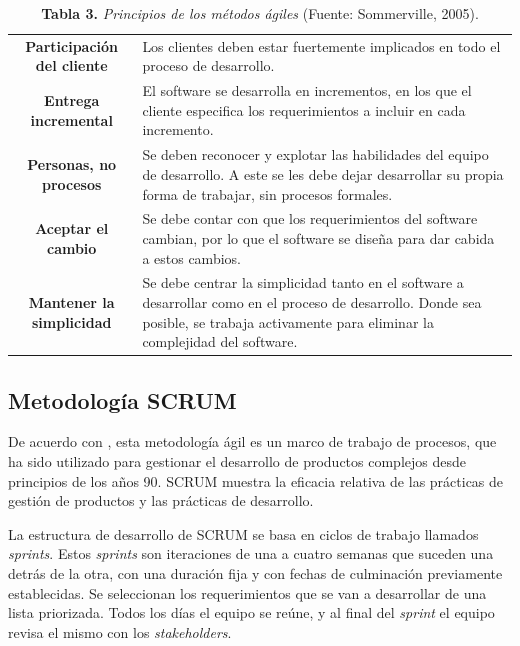 \FloatBarrier %
\vline
	\begin{table}[htb]
		\small
		\centering
		\setlength{\extrarowheight}{5pt}
		\begin{tabulary}{15cm}{|c|L|}
			\hline
			 & \\ \hline
			\textbf{Participaci\'{o}n del cliente} & Los clientes deben estar fuertemente implicados en todo el proceso de desarrollo.\\ \hline
			\textbf{Entrega incremental} & El software se desarrolla en incrementos, en los que el cliente especifica los requerimientos a incluir en cada incremento.\\ \hline
			\textbf{Personas, no procesos} & Se deben reconocer y explotar las habilidades del equipo de desarrollo. A este se les debe dejar desarrollar su propia forma de trabajar, sin procesos formales.\\ \hline
			\textbf{Aceptar el cambio} & Se debe contar con que los requerimientos del software cambian, por lo que el software se dise\~{n}a para dar cabida a estos cambios.\\ \hline
			\textbf{Mantener la simplicidad} & Se debe centrar la simplicidad tanto en el software a desarrollar como en el proceso de desarrollo. Donde sea posible, se trabaja activamente para eliminar la complejidad del software.\\ \hline
		\end{tabulary}
		\caption{\textbf{Tabla 3.} \textit{Principios de los m\'{e}todos \'{a}giles} (Fuente: Sommerville, 2005).}
	\end{table}
\FloatBarrier %

		\subsection{Metodolog\'{i}a SCRUM}
De acuerdo con \cite{Schwaber&Sutherland}, esta metodolog\'{i}a \'{a}gil es un marco de trabajo de procesos, que ha sido utilizado para gestionar el desarrollo de productos complejos desde principios de los a\~{n}os 90. SCRUM muestra la eficacia relativa de las pr\'{a}cticas de gesti\'{o}n de productos y las pr\'{a}cticas de desarrollo.

La estructura de desarrollo de SCRUM se basa en ciclos de trabajo llamados \textit{sprints}. Estos \textit{sprints} son iteraciones de una a cuatro semanas que suceden una detr\'{a}s de la otra, con una duraci\'{o}n fija y con fechas de culminaci\'{o}n previamente establecidas. Se seleccionan los requerimientos que se van a desarrollar de una lista priorizada. Todos los d\'{i}as el equipo se re\'{u}ne, y al final del \textit{sprint} el equipo revisa el mismo con los \textit{stakeholders}.

